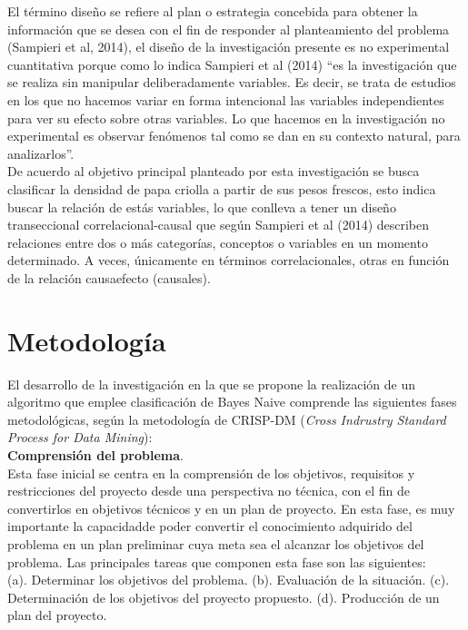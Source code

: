 El término diseño se refiere al plan o estrategia concebida para obtener la información que se desea con el fin de responder al
planteamiento del problema (Sampieri et al, 2014), el diseño de la investigación presente es no experimental cuantitativa porque como lo indica Sampieri et al (2014) “es la investigación que se realiza sin manipular deliberadamente variables. Es decir, se trata de estudios en los que no hacemos variar en forma intencional las variables independientes para ver su efecto sobre otras variables. Lo que hacemos en la investigación no experimental es observar fenómenos tal como se dan en su contexto natural, para analizarlos”.\\

De acuerdo al objetivo principal planteado por esta investigación se busca clasificar la densidad de papa criolla a partir de sus pesos frescos, esto indica buscar la relación de estás variables, lo que conlleva a tener un diseño transeccional correlacional-causal que según Sampieri et al (2014) describen relaciones entre dos o más categorías, conceptos o variables en un momento determinado. A veces, únicamente en términos correlacionales, otras en función de la relación causaefecto (causales).
  

\section{Metodolog\'ia}

El desarrollo de la investigación en la que se propone la realización de un algoritmo que emplee clasificación de Bayes Naive comprende las siguientes fases metodológicas, según la metodología de CRISP-DM (\emph{Cross Indrustry Standard Process for Data Mining}):\\

\noindent
\textbf{Comprensión del problema}.\\

	Esta fase inicial se centra en la comprensión de los objetivos, requisitos y restricciones del proyecto desde una perspectiva no técnica, con el fin de convertirlos en objetivos técnicos y en un plan de proyecto. En esta fase, es muy importante la capacidadde poder convertir el conocimiento adquirido del problema en un plan preliminar cuya meta sea el alcanzar los objetivos del problema. Las principales tareas que componen esta fase son las siguientes:\\

(a).	Determinar los objetivos del problema.
(b).	Evaluación de la situación.
(c).	Determinación de los objetivos del proyecto propuesto.
(d).	Producción de un plan del proyecto.\\


